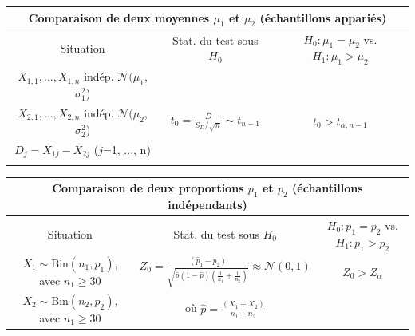 \documentclass[12pt,french]{article}
\begin{document}
{\begin{center}
\begin{tabular}{|c|c|c|}
\hline
 \multicolumn{3}{|c|}{{\bf Comparaison de deux moyennes
$\mu_1$ et $\mu_2$ (échantillons appariés)}}
\\
\hline Situation & Stat. du test sous $H_0$ & $H_{0}:\mu_1=\mu_2$ vs. $H_{1}:\mu_1>\mu_2$
\\

\hline \hline 
$X_{1,1}, ..., X_{1,n}$ indép. $\mathcal{N}(\mu_1$, $\sigma^2_1$)& & \\
$X_{2,1}, ..., X_{2,n}$ indép. $\mathcal{N}(\mu_2$, $\sigma^2_2$)
&$\displaystyle t_0 = \frac{\overline D}{S_D/\sqrt n} \sim
t_{n-1}$ & $t_0 > t_{\alpha, n-1}$
\\
$D_j = X_{1j} - X_{2j}$  ({\small $j$=1, ...,
n})& &
\\


\hline \multicolumn{3}{c}{ }
\\


\end{tabular}
\end{center}


\begin{center}
\begin{tabular}{|c|c|c|}
\hline \multicolumn{3}{|c|}{{\bf Comparaison de deux proportions
$p_{1}$ et $p_{2}$ (échantillons indépendants)}}
\\
\hline Situation & Stat. du test sous $H_0$& $H_{0}: p_{1} =
p_{2}$ vs. $H_{1}:p_{1} > p_{2}$
\\

\hline \hline 
$X_{1}\sim \text{Bin}(n_1,p_1)$, avec $n_1\geq 30$ & $\displaystyle Z_0 = \frac{(\hat
p_1 - \hat p_2)} {\sqrt{\displaystyle\hat p (1-\hat p) \left(
\frac{1}{n_1} + \frac{1}{n_2} \right)}} \approx
\mathcal{N}(0,1)$ & $Z_0 > Z_{\alpha}$
\\
$X_{2}\sim \text{Bin}(n_2,p_2)$, avec $n_1\geq 30$ & où $\displaystyle \hat p =
\frac{(X_1 + X_2)}{n_1 + n_2}$  &
\\

\hline
\end{tabular}
\end{center}
}
\newpage
\end{document}
